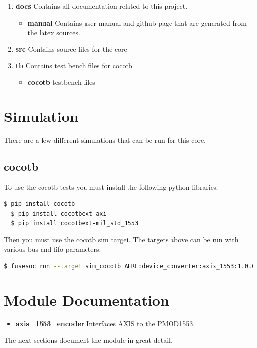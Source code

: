 \begin{enumerate}
  \item \textbf{docs} Contains all documentation related to this project.
    \begin{itemize}
      \item \textbf{manual} Contains user manual and github page that are generated from the latex sources.
    \end{itemize}
  \item \textbf{src} Contains source files for the core
  \item \textbf{tb} Contains test bench files for cocotb
    \begin{itemize}
      \item \textbf{cocotb} testbench files
    \end{itemize}
\end{enumerate}

\newpage

\section{Simulation}
\par
There are a few different simulations that can be run for this core.

\subsection{cocotb}
\par
To use the cocotb tests you must install the following python libraries.
\begin{lstlisting}[language=bash]
  $ pip install cocotb
  $ pip install cocotbext-axi
  $ pip install cocotbext-mil_std_1553
\end{lstlisting}

Then you must use the cocotb sim target. The targets above can be run with various bus and fifo parameters.

\begin{lstlisting}[language=bash]
  $ fusesoc run --target sim_cocotb AFRL:device_converter:axis_1553:1.0.0
\end{lstlisting}


\newpage

\section{Module Documentation} \label{Module Documentation}

\begin{itemize}
\item \textbf{axis\_1553\_encoder} Interfaces AXIS to the PMOD1553.\\
\end{itemize}
The next sections document the module in great detail.

